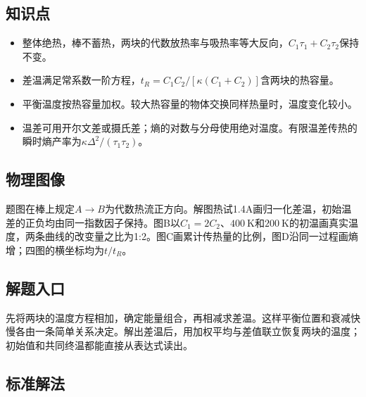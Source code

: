 \documentclass[UTF8,fontset=fandol,a4paper,11pt]{ctexart}
\begin{document}

\subsection*{知识点}

\begin{itemize}
\item 整体绝热，棒不蓄热，两块的代数放热率与吸热率等大反向，$C_1\tau_1+C_2\tau_2$保持不变。
\item 差温满足常系数一阶方程，$t_R=C_1C_2/[\kappa(C_1+C_2)]$含两块的热容量。
\item 平衡温度按热容量加权。较大热容量的物体交换同样热量时，温度变化较小。
\item 温差可用开尔文差或摄氏差；熵的对数与分母使用绝对温度。有限温差传热的瞬时熵产率为$\kappa\Delta^2/(\tau_1\tau_2)$。
\end{itemize}



\subsection*{物理图像}

题图在棒上规定$A\to B$为代数热流正方向。解图热试1.4A画归一化差温，初始温差的正负均由同一指数因子保持。图B以$C_1=2C_2$、$400\ \mathrm K$和$200\ \mathrm K$的初温画真实温度，两条曲线的改变量之比为1:2。图C画累计传热量的比例，图D沿同一过程画熵增；四图的横坐标均为$t/t_R$。



\subsection*{解题入口}

先将两块的温度方程相加，确定能量组合，再相减求差温。这样平衡位置和衰减快慢各由一条简单关系决定。解出差温后，用加权平均与差值联立恢复两块的温度；初始值和共同终温都能直接从表达式读出。



\subsection*{标准解法}
\end{document}
